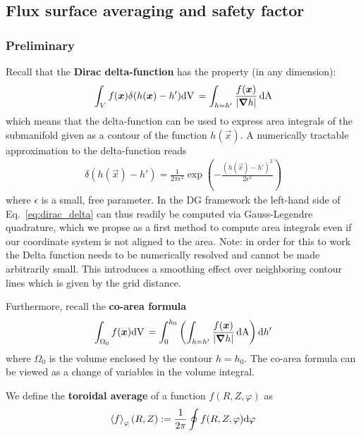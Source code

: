\subsection{Flux surface averaging and safety factor}
\subsubsection{Preliminary}
Recall that the {\bf Dirac delta-function} has the property (in any dimension):
\begin{align} \label{eq:dirac_delta}
\int_V f({\boldsymbol{x}}) \delta(h({\boldsymbol{x}}) - h') \mathrm{dV}\, = \int_{h=h'} \frac{f({\boldsymbol{x}})}{|{\boldsymbol{\nabla}} h|} \,\mathrm{dA}
\end{align}
which means that the delta-function can be used to express area integrals of the
submanifold given as a contour of the function $h(\vec x)$.
A numerically tractable approximation to the delta-function reads
\begin{align}\label{eq:delta}
\delta(h(\vec x)-h') = \frac{1}{2\pi \epsilon^2}
\exp\left( - \frac{\left(h(\vec x)-h'\right)^2}{2\epsilon^2}\right)
\end{align}
where $\epsilon$ is a small, free parameter.
In the DG framework the left-hand side
of Eq.~\eqref{eq:dirac_delta} can thus readily be computed
via Gauss-Legendre quadrature, which we propse as a first method to compute area
integrals even if our coordinate system is not aligned to the area.
Note: in order for this to work the Delta function needs to be numerically
resolved and cannot be made arbitrarily small.
This introduces a smoothing effect
over neighboring contour lines which is given by the grid distance.

Furthermore, recall the {\bf co-area formula}
\begin{align} \label{eq:coarea}
\int_{\Omega_0} f({\boldsymbol{x}}) \mathrm{dV}\, =
\int_0^{h_0} \left( \int_{h=h'} \frac{f({\boldsymbol{x}})}{|{\boldsymbol{\nabla}} h|}  \,\mathrm{dA}  \right) \mathrm{d} h'
\end{align}
where $\Omega_0$ is the volume enclosed by the contour $h=h_0$.
The co-area formula can be viewed as a change of variables in the
volume integral.

We define the {\bf toroidal average} of a function $f(R,Z,\varphi)$ as
\begin{align} \label{eq:phi_average}
\left \langle  f \right\rangle_\varphi(R,Z) := \frac{1}{2\pi}\oint f(R,Z,\varphi)\mathrm{d} \varphi
\end{align}

